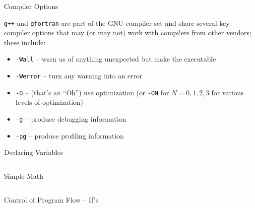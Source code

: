 \documentclass[10pt]{beamer}
\begin{document}
\begin{frame}{Compiler Options}

{\tt g++} and {\tt gfortran} are part of the GNU compiler set and share 
several key compiler options that may (or may not) work with compilers from
other vendors; these include:
\begin{itemize}
 \item {\tt -Wall} -- warn us of anything unexpected but make the executable
 \item {\tt -Werror} -- turn any warning into an error
 \item {\tt -O} -- (that's an ``Oh'') use optimization (or {\tt -ON} for $N=0,1,2,3$ for 
       various levels of optimization)
 \item {\tt -g} -- produce debugging information
 \item {\tt -pg} -- produce profiling information
\end{itemize}


\end{frame}

\begin{frame}{Declaring Variables}
\begin{columns}[c]
  \begin{column}{0.5\textwidth}
    
  \end{column}
  \begin{column}{0.5\textwidth}
    
  \end{column}
\end{columns}
\end{frame}

\begin{frame}{Simple Math}
\begin{columns}[c]
  \begin{column}{0.5\textwidth}
    
  \end{column}
  \begin{column}{0.5\textwidth}
    
  \end{column}
\end{columns}
\end{frame}

\begin{frame}{Control of Program Flow -- If's}
\begin{columns}[c]
  \begin{column}{0.5\textwidth}
    
  \end{column}
  \begin{column}{0.5\textwidth}
    
  \end{column}
\end{columns}
\end{frame}
\end{document}
